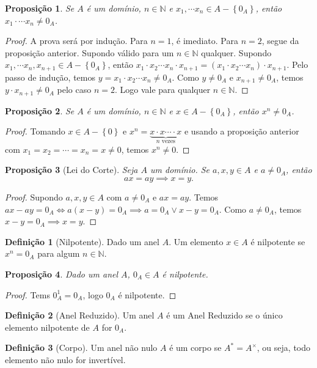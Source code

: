 \documentclass{article}
\newtheorem{prop}{Proposição}[section]
\theoremstyle{theorem}
\theoremstyle{lemma}
\theoremstyle{definition}
\newtheorem{definicao}{Definição}[section]
\theoremstyle{remark}
\begin{document}
\begin{prop}
	Se $A$ é um domínio, $n\in \mathbb{N}$ e $x_1,\cdots x_n\in A- \left\{0_A\right\}$, então $x_1\cdot \cdots x_n \neq 0_A$.
\end{prop}
\begin{proof}
	A prova será por indução. Para $n=1$, é imediato. Para $n = 2$, segue da proposição anterior. Supondo válido para um $n\in \mathbb{N}$ qualquer.
	Supondo $x_1,\cdots x_n, x_{n+1} \in A - \left\{0_A \right\}$, então $x_1\cdot x_2\cdots x_n \cdot x_{n+1} = (x_1\cdot x_2\cdots x_n) \cdot x_{n+1} $. Pelo passo de indução, temos $ y = x_1\cdot x_2\cdots x_n \neq 0_A$. Como $y\neq 0_A$ e $x_{n+1}\neq 0_A$, temos $y\cdot x_{n+1} \neq 0_A$ pelo caso $n=2$. Logo vale para qualquer $n\in \mathbb{N}$.
\end{proof}
\begin{prop}
	\label{propNilpotente}
	Se $A$ é um domínio, $n\in \mathbb{N}$ e $x\in A- \left\{0_A\right\}$, então $x^n \neq 0_A$.
\end{prop}
\begin{proof}
	Tomando $x\in A - \left\{0 \right\}$ e  $x^n = \underbrace{x\cdot x\cdots \cdot x}_{n \text{ vezes}}$ e usando a proposição anterior com $x_1 = x_2 = \cdots = x_n = x \neq 0 $, temos $x^n \neq 0$.
\end{proof}
\begin{prop}[Lei do Corte]
	Seja $A$ um domínio. Se $a,x,y \in A$ e $a\neq 0_A$, então $$ ax = ay \implies x = y.$$
\end{prop}
\begin{proof}
	Supondo $a,x,y\in A$ com $a\neq 0_A$ e $ax=ay$. Temos $ax -ay = 0_A  \iff a(x-y) = 0_A \implies a = 0_A \lor x-y = 0_A$.  Como $a\neq 0_A$, temos $x-y = 0_A \implies x = y$.
\end{proof}
\begin{definicao}[Nilpotente]
	Dado um anel $A$. Um elemento $x\in A$ é nilpotente se $x^n = 0_A$ para algum $n\in \mathbb{N}$.
\end{definicao}
\begin{prop}
	Dado um anel $A$, $0_A \in A$ é nilpotente.
\end{prop}
\begin{proof}
	Tems $0_A^1 = 0_A $, logo $0_A$ é nilpotente.
\end{proof}
\begin{definicao}[Anel Reduzido]
	Um anel $A$ é um Anel Reduzido  se o único elemento nilpotente de $A$ for $0_A$.
\end{definicao}
\begin{definicao}[Corpo]
	Um anel não nulo $A$ é um corpo se $A^{*} = A^{\times}$, ou seja, todo elemento não nulo for invertível.
\end{definicao}
\end{document}
